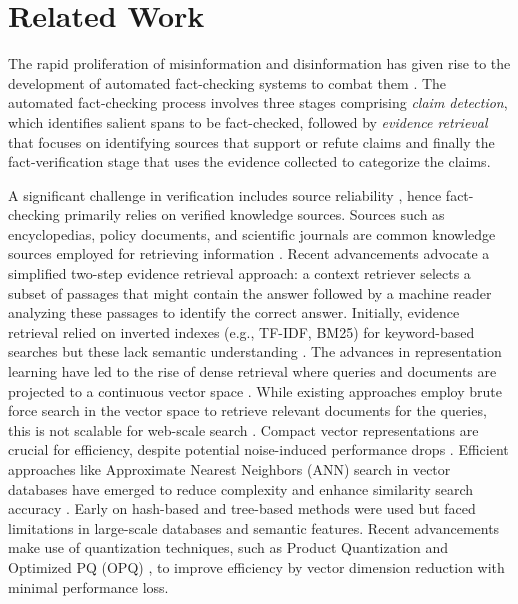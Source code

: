 \section{Related Work}
\vspace{-1em}
The rapid proliferation of misinformation and disinformation has given rise to the development of automated fact-checking systems to combat them \cite{thorne2018fever,programfc,guo2022survey,v2024quantemprealworldopendomainbenchmark,questgen}. The automated fact-checking process involves three stages comprising \textit{claim detection}, which identifies salient spans to be fact-checked, 
followed by \textit{evidence retrieval} that focuses on identifying sources that support or refute claims and finally the fact-verification stage that uses the evidence collected to categorize the claims.

A significant challenge in verification includes source reliability \cite{guo2022survey}, hence fact-checking primarily relies on verified knowledge sources. Sources such as encyclopedias, policy documents, and scientific journals are common knowledge sources employed for retrieving information \cite{Lazarski2021nlpfact, thorne2018automated}. Recent advancements advocate a simplified two-step evidence retrieval approach: a context retriever selects a subset of passages that might contain the answer followed by a machine reader analyzing these passages to identify the correct answer. Initially, evidence retrieval relied on inverted indexes (e.g., TF-IDF, BM25) for keyword-based searches but these lack semantic understanding \cite{baranchuk2018revisiting, wei2022}. The advances in representation learning have led to the rise of dense retrieval where queries and documents are projected to a continuous vector space  \cite{karpukhin2020dense, zhao2022,Guo_2022}. While existing approaches employ brute force search in the vector space to retrieve relevant documents for the queries, this is not scalable for web-scale search \cite{bondarenko2021understanding, zhu2023survey, han2023comprehensive, wei2022,tas_b}. Compact vector representations are crucial for efficiency, despite potential noise-induced performance drops \cite{zhan2021jointly}. Efficient approaches like Approximate Nearest Neighbors (ANN) search in vector databases have emerged to reduce complexity and enhance similarity search accuracy \cite{han2023comprehensive, wei2022, zhao2023ann}. Early on hash-based and tree-based methods were used but faced limitations in large-scale databases and semantic features. Recent advancements make use of quantization techniques, such as Product Quantization\cite{jegou2011pq} and Optimized PQ (OPQ) \cite{ge2014opq}, to improve efficiency by vector dimension reduction with minimal performance loss.

